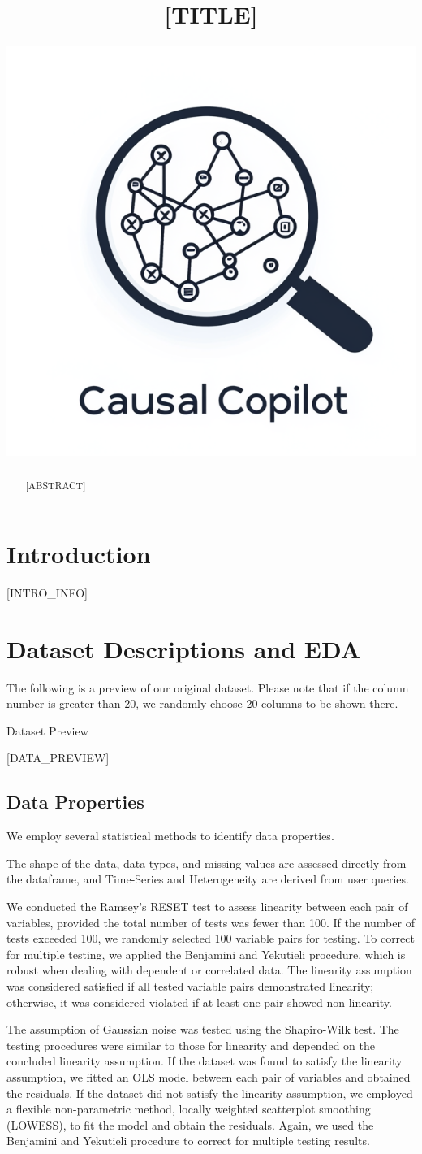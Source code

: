 \documentclass{article}
\title{[TITLE]}
\author{ \href{https://orcid.org/0000-0000-0000-0000}{\includegraphics[scale=0.06]{asset/logo.png}} }
\begin{document}
\maketitle

\begin{abstract}
[ABSTRACT]
\end{abstract}


\raggedbottom
\section{Introduction}
[INTRO_INFO]

\section{Dataset Descriptions and EDA}
The following is a preview of our original dataset. Please note that if the column number is greater than 20,
we randomly choose 20 columns to be shown there.

\begin{table}[H]
    \centering
    \caption{Dataset Preview}
    [DATA_PREVIEW]
\end{table}

\subsection{Data Properties}
We employ several statistical methods to identify data properties.

The shape of the data, data types, and missing values are assessed directly from the dataframe, and Time-Series and Heterogeneity are derived from user queries.

We conducted the Ramsey's RESET test to assess linearity between each pair of variables, provided the total number of tests was fewer than 100. If the number of tests exceeded 100, we randomly selected 100 variable pairs for testing.
To correct for multiple testing, we applied the Benjamini and Yekutieli procedure, which is robust when dealing with dependent or correlated data. 
The linearity assumption was considered satisfied if all tested variable pairs demonstrated linearity; otherwise, it was considered violated if at least one pair showed non-linearity.

The assumption of Gaussian noise was tested using the Shapiro-Wilk test. The testing procedures were similar to those for linearity and depended on the concluded linearity assumption. 
If the dataset was found to satisfy the linearity assumption, we fitted an OLS model between each pair of variables and obtained the residuals. 
If the dataset did not satisfy the linearity assumption, we employed a flexible non-parametric method, locally weighted scatterplot smoothing (LOWESS), to fit the model and obtain the residuals. 
Again, we used the Benjamini and Yekutieli procedure to correct for multiple testing results. 
\end{document}

